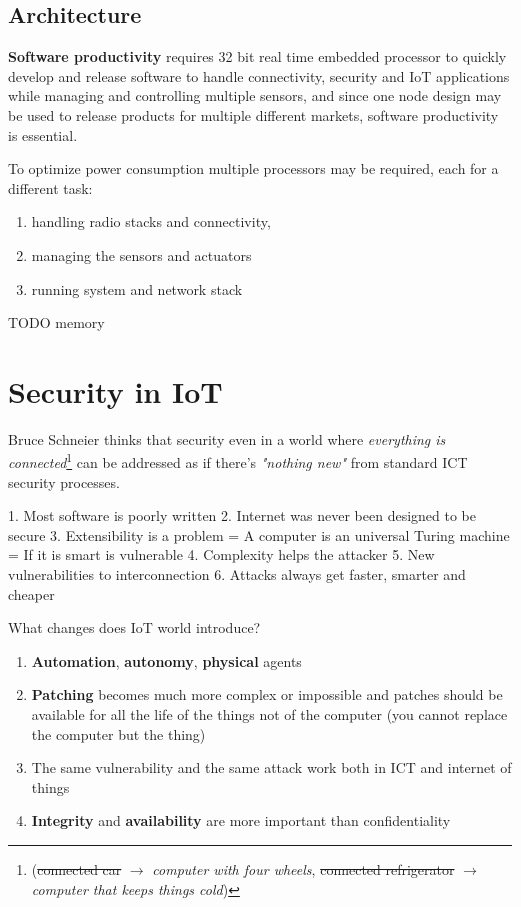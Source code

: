 \subsection{Architecture}
\textbf{Software productivity} requires 32 bit real time embedded processor to quickly
develop and release software to handle connectivity, security and IoT
applications while managing and controlling multiple sensors,
and since one node design may be used to
release products for multiple different markets,
software productivity is essential.

To optimize power consumption multiple processors may be required, each for a different task:
\begin{enumerate}
   \item handling radio stacks and connectivity, 
   \item managing the sensors and actuators
   \item running system and network stack
\end{enumerate}
    
TODO memory

\section{Security in IoT}
Bruce Schneier thinks that
security even in a world where \textit{everything is connected}\footnote{(\st{connected car} $\longrightarrow$ \textit{computer with four wheels}, \st{connected refrigerator} $\longrightarrow$ \textit{computer that keeps things cold})} can be addressed as if there's \textit{"nothing new"} from standard ICT security processes.

1. Most software is poorly written
2. Internet was never been designed to be secure
3. Extensibility is a problem = A computer is an universal Turing
machine = If it is smart is vulnerable
4. Complexity helps the attacker
5. New vulnerabilities to interconnection
6. Attacks always get faster, smarter and cheaper


What changes does IoT world introduce?
\begin{enumerate}
   \item \textbf{Automation}, \textbf{autonomy}, \textbf{physical} agents
   \item \textbf{Patching} becomes much more complex or impossible and
   patches should be available for all the life of the things not of
   the computer (you cannot replace the computer but the thing)
   \item The same vulnerability and the same attack work both in ICT
   and internet of things
   \item \textbf{Integrity} and \textbf{availability} are more important than
   confidentiality
\end{enumerate}

